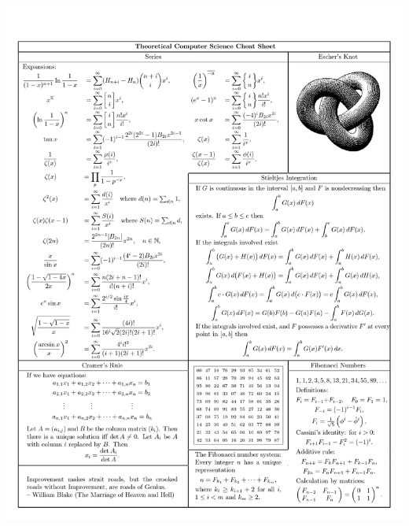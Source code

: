 \documentclass{article}
\begin{document}
\newpage
\includegraphics[trim = 6mm 2mm 0mm 10mm,clip=true,scale = 0.73]{./images/image-0010.jpg}
\end{document}
